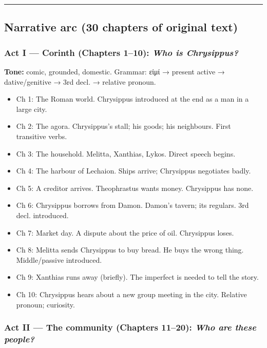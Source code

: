 \documentclass[a4paper]{report}
\begin{document}
\begin{center}\rule{0.5\linewidth}{0.5pt}\end{center}

\subsection{Narrative arc (30 chapters of original
text)}\label{narrative-arc-30-chapters-of-original-text}

\subsubsection{\texorpdfstring{Act I --- Corinth (Chapters 1--10):
\emph{Who is
Chrysippus?}}{Act I --- Corinth (Chapters 1--10): Who is Chrysippus?}}\label{act-i-corinth-chapters-110-who-is-chrysippus}

\textbf{Tone:} comic, grounded, domestic. Grammar: εἰμί → present active
→ dative/genitive → 3rd decl. → relative pronoun.

\begin{itemize}
\tightlist
\item
  Ch 1: The Roman world. Chrysippus introduced at the end as a man in a
  large city.
\item
  Ch 2: The agora. Chrysippus's stall; his goods; his neighbours. First
  transitive verbs.
\item
  Ch 3: The household. Melitta, Xanthias, Lykos. Direct speech begins.
\item
  Ch 4: The harbour of Lechaion. Ships arrive; Chrysippus negotiates
  badly.
\item
  Ch 5: A creditor arrives. Theophrastus wants money. Chrysippus has
  none.
\item
  Ch 6: Chrysippus borrows from Damon. Damon's tavern; its regulars. 3rd
  decl. introduced.
\item
  Ch 7: Market day. A dispute about the price of oil. Chrysippus loses.
\item
  Ch 8: Melitta sends Chrysippus to buy bread. He buys the wrong thing.
  Middle/passive introduced.
\item
  Ch 9: Xanthias runs away (briefly). The imperfect is needed to tell
  the story.
\item
  Ch 10: Chrysippus hears about a new group meeting in the city.
  Relative pronoun; curiosity.
\end{itemize}

\subsubsection{\texorpdfstring{Act II --- The community (Chapters
11--20): \emph{Who are these
people?}}{Act II --- The community (Chapters 11--20): Who are these people?}}\label{act-ii-the-community-chapters-1120-who-are-these-people}
\end{document}
